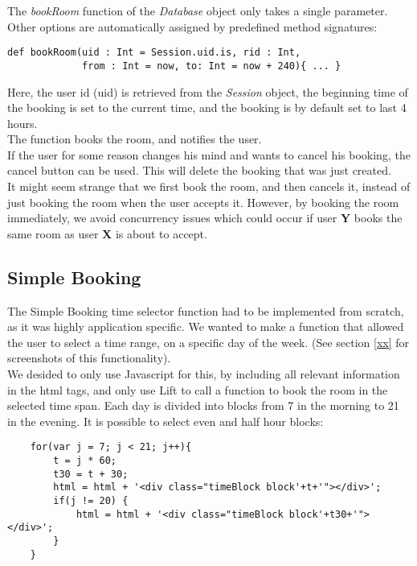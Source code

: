 The \emph{bookRoom} function of the \emph{Database} object only takes a single parameter. Other options are automatically assigned by predefined method signatures:

\begin{verbatim}
def bookRoom(uid : Int = Session.uid.is, rid : Int, 
             from : Int = now, to: Int = now + 240){ ... }
\end{verbatim}

Here, the user id (uid) is retrieved from the \emph{Session} object, the beginning time of the booking is set to the current time, and the booking is by default set to last 4 hours. \\
The function books the room, and notifies the user.\\

If the user for some reason changes his mind and wants to cancel his booking, the cancel button can be used. This will delete the booking that was just created. \\
It might seem strange that we first book the room, and then cancels it, instead of just booking the room when the user accepts it. However, by booking the room immediately, we avoid concurrency issues which could occur if user \textbf{Y} books the same room as user \textbf{X} is about to accept.

\subsection{Simple Booking}
The Simple Booking time selector function had to be implemented from scratch, as it was highly application specific. We wanted to make a function that allowed the user to select a time range, on a specific day of the week. (See section \ref{xx} for screenshots of this functionality). \\
We desided to only use Javascript for this, by including all relevant information in the html tags, and only use Lift to call a function to book the room in the selected time span. Each day is divided into blocks from 7 in the morning to 21 in the evening. It is possible to select even and half hour blocks:

\begin{verbatim}
    for(var j = 7; j < 21; j++){
        t = j * 60;
        t30 = t + 30;
        html = html + '<div class="timeBlock block'+t+'"></div>';
        if(j != 20) {
            html = html + '<div class="timeBlock block'+t30+'"></div>';	
        }
    }
\end{verbatim}

